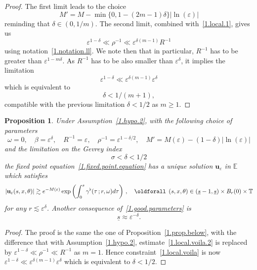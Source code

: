 \documentclass[10pt]{amsart}
\newtheorem{prop}[cdrthm]{Proposition}
\theoremstyle{definition}
\theoremstyle{plain}
\newcommand*\e{\varepsilon}
\newcommand*\EE{{\mathbb E}}
\newcommand*\g{\gamma}
\newcommand{\ubf}{{\mathbf u}}
\newcommand*\und{\underline}
\renewcommand*{\forall}{\mathrel{\oldforall}}
\begin{document}
\begin{proof}
The first limit leads to the choice
\[
M' = M - \min\{ 0, 1 - (2m-1)\delta \}|\ln(\e)|
\]
reminding that $\delta\in(0,1/m)$. The second limit, combined with~\eqref{1.local.1}, gives us
\begin{equation}\label{1.local.voila.2}
\e^{1-\delta} \ll \rho^{-1} \ll \e^{\delta(m-1)} R^{-1}
\end{equation}
using notation~\eqref{1.notation.ll}. We note then that in particular, $R^{-1}$ has to be greater than $\e^{1-m\delta}$. As $R^{-1}$ has to be also smaller than $\e^{\delta}$, it implies the limitation
\begin{equation}\label{1.local.voila}
\e^{1-\delta} \ll \e^{\delta(m-1)} \e^{\delta}
\end{equation}
which is equivalent to
\[
\delta <1/(m+1),
\]
compatible with the previous limitation $\delta <1/2$ as $m \geq 1$.
\end{proof}


\begin{prop}\label{1.prop.below.bis}
Under Assumption~\ref{1.hypo.2}, with the following choice of parameters
\begin{equation}\label{1.good.parameters.bis}
\omega = 0, \quad \beta = \e^{\delta}, \quad R^{-1} = \e, \quad \rho^{-1} = \e^{1-\delta/2}, \quad M' = M(\e) - (1-\delta)|\ln(\e)|
\end{equation}
and the limitation on the Gevrey index
\[
\sigma < \delta <1/2
\]
the fixed point equation~\eqref{1.fixed.point.equation} has a unique solution $\ubf_{\e}$ in $\EE$ which satisfies
\begin{equation}
|\ubf_{\e}(s,x,\theta)| \gtrsim e^{-M(\e)} \exp \left(\int_{0}^{s} \g^{\flat}(\tau\,; r, \omega) d\tau \right) \,, \quad \forall\,(s,x,\theta)\in(\und{s} - 1, \und{s}) \times B_r(0)\times\mathbb{T}
\end{equation}
for any $r \lesssim \e^{\delta}$. Another consequence of~\eqref{1.good.parameters} is
\begin{equation}
\label{1.final.und.s.bis}
\und{s} \approx \e^{-\delta}.
\end{equation}
\end{prop}

\begin{proof}
The proof is the same the one of Proposition~\ref{1.prop.below}, with the difference that with Assumption~\ref{1.hypo.2}, estimate~\eqref{1.local.voila.2} is replaced by $\e^{1-\delta} \ll \rho^{-1} \ll R^{-1}$ as $m=1$. Hence constraint~\eqref{1.local.voila} is now $ \e^{1-\delta} \ll \e^{\delta(m-1)} \e^{\delta} $ which is equivalent to $\delta <1/2$.
\end{proof}
\end{document}
